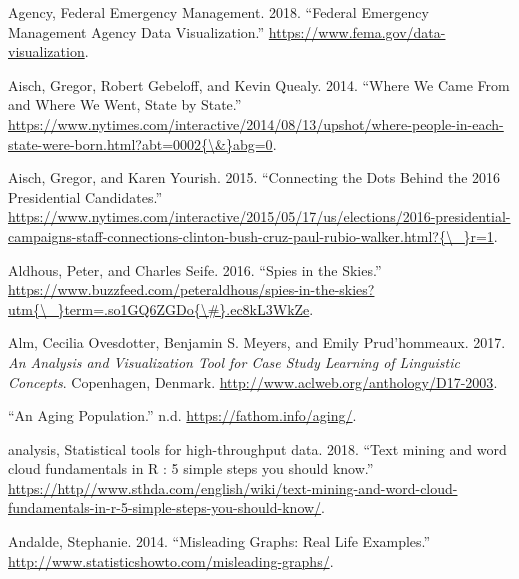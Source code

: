 \documentclass[]{book}
\begin{document}
\leavevmode\hypertarget{ref-fema_viz}{}%
Agency, Federal Emergency Management. 2018. ``Federal Emergency Management Agency Data Visualization.'' \url{https://www.fema.gov/data-visualization}.

\leavevmode\hypertarget{ref-migration}{}%
Aisch, Gregor, Robert Gebeloff, and Kevin Quealy. 2014. ``Where We Came From and Where We Went, State by State.'' \href{https://www.nytimes.com/interactive/2014/08/13/upshot/where-people-in-each-state-were-born.html?abt=0002\%7B/\&\%7Dabg=0}{https://www.nytimes.com/interactive/2014/08/13/upshot/where-people-in-each-state-were-born.html?abt=0002\{\textbackslash{}\&\}abg=0}.

\leavevmode\hypertarget{ref-campaign_staff}{}%
Aisch, Gregor, and Karen Yourish. 2015. ``Connecting the Dots Behind the 2016 Presidential Candidates.'' \href{https://www.nytimes.com/interactive/2015/05/17/us/elections/2016-presidential-campaigns-staff-connections-clinton-bush-cruz-paul-rubio-walker.html?\%7B/_\%7Dr=1}{https://www.nytimes.com/interactive/2015/05/17/us/elections/2016-presidential-campaigns-staff-connections-clinton-bush-cruz-paul-rubio-walker.html?\{\textbackslash{}\_\}r=1}.

\leavevmode\hypertarget{ref-spies_sky}{}%
Aldhous, Peter, and Charles Seife. 2016. ``Spies in the Skies.'' \href{https://www.buzzfeed.com/peteraldhous/spies-in-the-skies?utm\%7B/_\%7Dterm=.so1GQ6ZGDo\%7B/\#\%7D.ec8kL3WkZe}{https://www.buzzfeed.com/peteraldhous/spies-in-the-skies?utm\{\textbackslash{}\_\}term=.so1GQ6ZGDo\{\textbackslash{}\#\}.ec8kL3WkZe}.

\leavevmode\hypertarget{ref-lingui_data}{}%
Alm, Cecilia Ovesdotter, Benjamin S. Meyers, and Emily Prud'hommeaux. 2017. \emph{An Analysis and Visualization Tool for Case Study Learning of Linguistic Concepts}. Copenhagen, Denmark. \url{http://www.aclweb.org/anthology/D17-2003}.

\leavevmode\hypertarget{ref-animated_pyramid}{}%
``An Aging Population.'' n.d. \url{https://fathom.info/aging/}.

\leavevmode\hypertarget{ref-r}{}%
analysis, Statistical tools for high-throughput data. 2018. ``Text mining and word cloud fundamentals in R : 5 simple steps you should know.'' \url{https://http//www.sthda.com/english/wiki/text-mining-and-word-cloud-fundamentals-in-r-5-simple-steps-you-should-know/}.

\leavevmode\hypertarget{ref-andale_2014}{}%
Andalde, Stephanie. 2014. ``Misleading Graphs: Real Life Examples.'' \url{http://www.statisticshowto.com/misleading-graphs/}.
\end{document}
